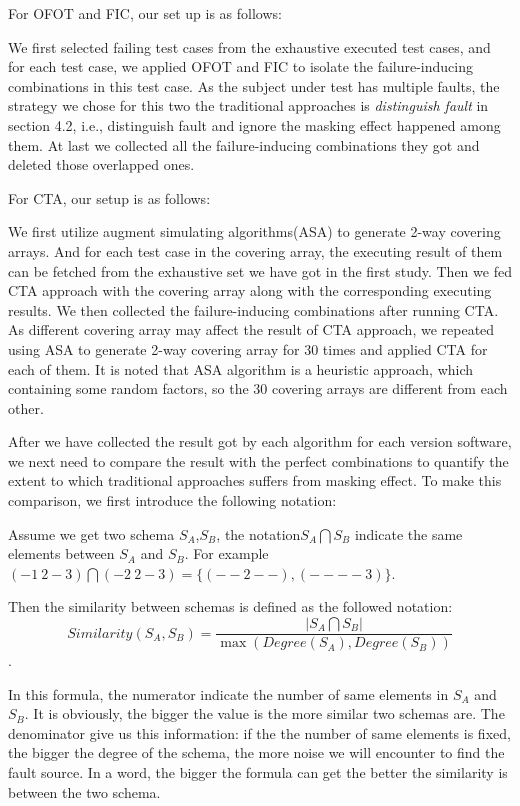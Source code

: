 \documentclass{sig-alternate}
\begin{document}
For OFOT and FIC, our set up is as follows:

We first selected failing test cases from the exhaustive executed test cases, and for each test case, we applied OFOT and FIC to isolate the failure-inducing combinations in this test case. As the subject under test has multiple faults, the strategy we chose for this two the traditional approaches is \emph{distinguish fault} in section 4.2, i.e., distinguish fault and ignore the masking effect happened among them. At last we collected all the failure-inducing combinations they got and deleted those overlapped ones. 

For CTA, our setup is as follows:

We first utilize augment simulating algorithms(ASA) to generate 2-way covering arrays. And for each test case in the covering array, the executing result of them can be fetched from the exhaustive set we have got in the first study. Then we fed CTA approach with the covering array along with the corresponding executing results. We then collected the failure-inducing combinations after running CTA. As different covering array may affect the result of CTA approach, we repeated using ASA to generate 2-way covering array for 30 times and applied CTA for each of them. It is noted that ASA algorithm is a heuristic approach, which containing some random factors, so the 30 covering arrays are different from each other. 

After we have collected the result got by each algorithm for each version software, we next need to compare the result with the perfect combinations to quantify the extent to which traditional approaches suffers from masking effect. To make this comparison, we first introduce the following notation:

Assume we get two schema $S_{A}$,$S_{B}$, the notation$S_{A} \bigcap S_{B}$ indicate the same elements between $S_{A}$ and $S_{B}$. For example $(- 1\ 2 - 3) \bigcap  (- 2\ 2 - 3) = \{ (- - 2 - -) , (- - - - 3)\}$.

Then the similarity between schemas is defined as the followed notation:
\begin{displaymath} Similarity(S_{A},S_{B})= \frac{|S_{A} \bigcap S_{B}|}{\max (Degree(S_{A}),Degree(S_{B})) } \end{displaymath}.

In this formula, the numerator indicate the number of same elements in  $S_{A}$ and $S_{B}$. It is obviously, the bigger the value is the more similar two schemas are.  The denominator give us this information: if the the number of same elements is fixed, the bigger the degree of the schema, the more noise we will encounter to find the fault source. In a word, the bigger the formula can get the better the similarity is between the two schema.
\end{document}
